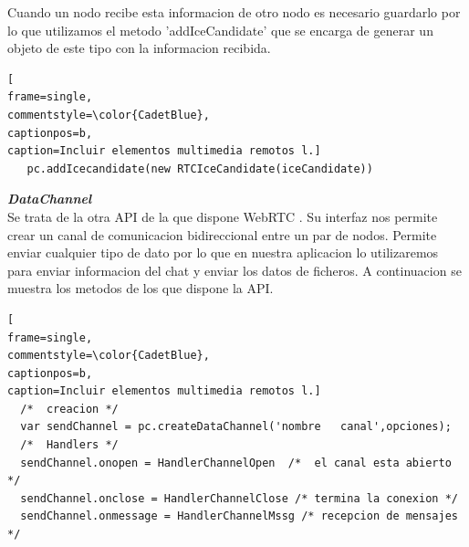 Cuando un nodo recibe esta informacion de otro nodo es necesario guardarlo por lo que utilizamos el metodo 'addIceCandidate' que se encarga de generar un objeto de este tipo con la informacion recibida.
\begin{lstlisting}[
frame=single,
commentstyle=\color{CadetBlue},
captionpos=b,
caption=Incluir elementos multimedia remotos l.]
   pc.addIcecandidate(new RTCIceCandidate(iceCandidate)) 
\end{lstlisting}
\textbf{\textit{DataChannel}}
\\Se trata de la otra API de la que dispone WebRTC . Su interfaz nos permite crear un canal de comunicacion bidireccional entre un par de nodos.
Permite enviar cualquier tipo de dato por lo que en nuestra aplicacion lo utilizaremos para enviar informacion  del chat y enviar los datos de ficheros. A continuacion se muestra los metodos de los que dispone la API.
\begin{lstlisting}[
frame=single,
commentstyle=\color{CadetBlue},
captionpos=b,
caption=Incluir elementos multimedia remotos l.]
  /*  creacion */
  var sendChannel = pc.createDataChannel('nombre   canal',opciones);
  /*  Handlers */
  sendChannel.onopen = HandlerChannelOpen  /*  el canal esta abierto */
  sendChannel.onclose = HandlerChannelClose /* termina la conexion */
  sendChannel.onmessage = HandlerChannelMssg /* recepcion de mensajes */ 
\end{lstlisting}
